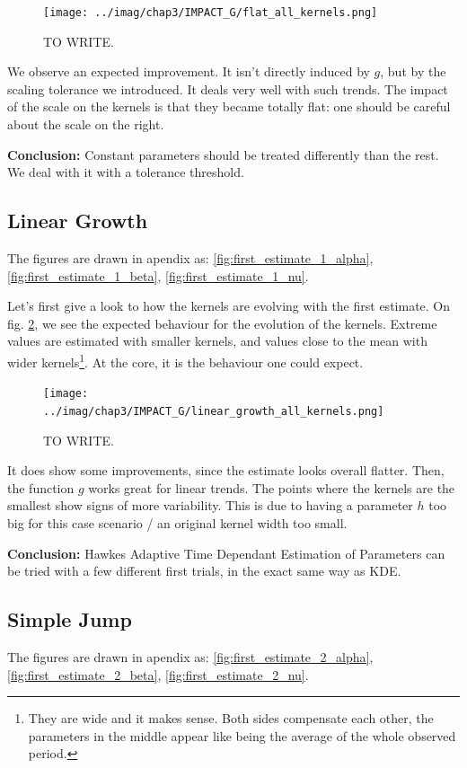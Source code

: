 \documentclass[11pt]{book}
\begin{document}
\begin{figure}
\centering
\texttt{[image: ../imag/chap3/IMPACT\_G/flat\_all\_kernels.png]}
\caption{TO WRITE.}
\label{fig:impact_g_flat}
\end{figure}


We observe an expected improvement. It isn't directly induced by $g$, but by the scaling tolerance we introduced. It deals very well with such trends. The impact of the scale on the kernels is that they became totally flat: one should be careful about the scale on the right.

\textbf{Conclusion:} Constant parameters should be treated differently than the rest. We deal with it with a tolerance threshold.




\subsection{Linear Growth}
The figures are drawn in apendix as: \ref{fig:first_estimate_1_alpha}, \ref{fig:first_estimate_1_beta}, \ref{fig:first_estimate_1_nu}.

Let's first give a look to how the kernels are evolving with the first estimate. On fig. \ref{fig:impact_g_linear}, we see the expected behaviour for the evolution of the kernels. Extreme values are estimated with smaller kernels, and values close to the mean with wider kernels\footnote{They are wide and it makes sense. Both sides compensate each other, the parameters in the middle appear like being the average of the whole observed period.}. At the core, it is the behaviour one could expect.

\begin{figure}
\centering
\texttt{[image: ../imag/chap3/IMPACT\_G/linear\_growth\_all\_kernels.png]}
\caption{TO WRITE.}
\label{fig:impact_g_linear}
\end{figure}

It does show some improvements, since the estimate looks overall flatter. Then, the function $g$ works great for linear trends. The points where the kernels are the smallest show signs of more variability. This is due to having a parameter $h$ too big for this case scenario / an original kernel width too small.


\textbf{Conclusion:} Hawkes Adaptive Time Dependant Estimation of Parameters can be tried with a few different first trials, in the exact same way as KDE.




\subsection{Simple Jump}
The figures are drawn in apendix as: \ref{fig:first_estimate_2_alpha}, \ref{fig:first_estimate_2_beta}, \ref{fig:first_estimate_2_nu}.
\end{document}

